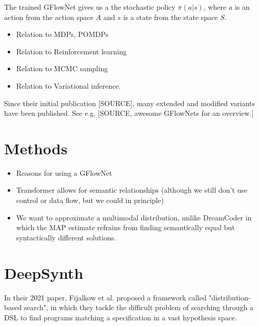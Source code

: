 The trained GFlowNet gives us a the stochastic policy $\pi(a|s)$, where $a$ is an action from the action space $A$ and $s$ is a state from the state space $S$.

\begin{itemize}
    \item Relation to MDPs, POMDPs
    \item Relation to Reinforcement learning
    \item Relation to MCMC sampling
    \item Relation to Variational inference. 
\end{itemize}

Since their initial publication [SOURCE], many extended and modified variants have been published. See e.g. [SOURCE, awesome GFlowNets for an overview.]

\section{Methods}

\begin{itemize}
    \item Reasons for using a GFlowNet
    \item Transformer allows for semantic relationships (although we still don't use control or data flow, but we could in principle)
    \item We want to approximate a multimodal distribution, unlike DreamCoder in which the MAP estimate refrains from finding semantically equal but syntactically different solutions.
\end{itemize}





























\section{DeepSynth}




In their 2021 paper, Fijalkow et al. proposed a framework called "distribution-based search", in which they tackle the difficult problem of searching through a DSL to find programs matching a specification in a vast hypothesis space. 

